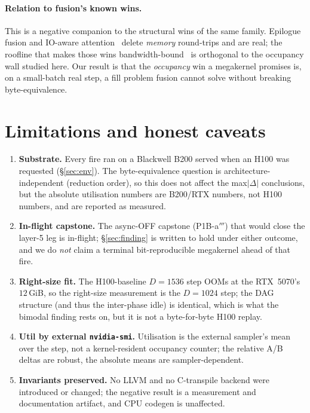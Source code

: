 \documentclass[11pt,a4paper]{article}
\begin{document}
\paragraph{Relation to fusion's known wins.}
This is a negative companion to the structural wins of the same family.
Epilogue fusion and IO-aware attention~\citep{dao2022flashattention} delete
\emph{memory} round-trips and are real; the roofline that makes those wins
bandwidth-bound~\citep{williams2009roofline} is orthogonal to the occupancy
wall studied here. Our result is that the \emph{occupancy} win a megakernel
promises is, on a small-batch real step, a fill problem fusion cannot solve
without breaking byte-equivalence.

\section{Limitations and honest caveats}
\label{sec:limits}

\begin{enumerate}\itemsep0.3em
\item \textbf{Substrate.} Every fire ran on a Blackwell B200 served when an
H100 was requested (\S\ref{sec:env}). The byte-equivalence question is
architecture-independent (reduction order), so this does not affect the
max$|\Delta|$ conclusions, but the absolute utilisation numbers are B200/RTX
numbers, not H100 numbers, and are reported as measured.
\item \textbf{In-flight capstone.} The async-OFF capstone (P1B-a$'''$) that
would close the layer-5 leg is in-flight; \S\ref{sec:finding} is written to
hold under either outcome, and we do \emph{not} claim a terminal
bit-reproducible megakernel ahead of that fire.
\item \textbf{Right-size fit.} The H100-baseline $D{=}1536$ step OOMs at the
RTX~5070's $12$\,GiB, so the right-size measurement is the $D{=}1024$ step;
the DAG structure (and thus the inter-phase idle) is identical, which is what
the bimodal finding rests on, but it is not a byte-for-byte H100 replay.
\item \textbf{Util by external \texttt{nvidia-smi}.} Utilisation is the
external sampler's mean over the step, not a kernel-resident occupancy
counter; the relative A/B deltas are robust, the absolute means are
sampler-dependent.
\item \textbf{Invariants preserved.} No LLVM and no C-transpile backend were
introduced or changed; the negative result is a measurement and documentation
artifact, and CPU codegen is unaffected.
\end{enumerate}
\end{document}
